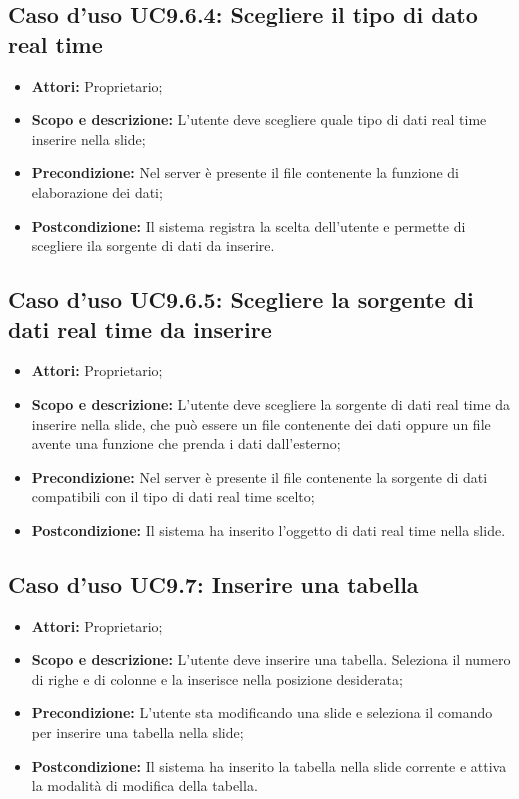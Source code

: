 	\subsection{Caso d'uso UC9.6.4: Scegliere il tipo di dato real time}
	\begin{itemize}
		\item \textbf{Attori:} Proprietario;
		\item \textbf{Scopo e descrizione:} L'utente deve scegliere quale tipo di dati real time inserire nella slide;
		\item \textbf{Precondizione:} Nel server è presente il file contenente la funzione di elaborazione dei dati;
		\item \textbf{Postcondizione:} Il sistema registra la scelta dell'utente e permette di scegliere ila sorgente di dati da inserire.
	\end{itemize}
	
	\subsection{Caso d'uso UC9.6.5: Scegliere la sorgente di dati real time da inserire}
	\begin{itemize}
		\item \textbf{Attori:} Proprietario;
		\item \textbf{Scopo e descrizione:} L'utente deve scegliere la sorgente di dati real time da inserire nella slide, che può essere un file contenente dei dati oppure un file avente una funzione che prenda i dati dall'esterno;
		\item \textbf{Precondizione:} Nel server è presente il file contenente la sorgente di dati compatibili con il tipo di dati real time scelto;
		\item \textbf{Postcondizione:} Il sistema ha inserito l'oggetto di dati real time nella slide.
	\end{itemize}
	

\subsection{Caso d'uso UC9.7: Inserire una tabella}
\begin{itemize}
	\item \textbf{Attori:} Proprietario;
	\item \textbf{Scopo e descrizione:} L'utente deve inserire una tabella. Seleziona il numero di righe e di colonne e la inserisce nella posizione desiderata;
	\item \textbf{Precondizione:} L'utente sta modificando una \gls{slide} e seleziona il comando per inserire una tabella nella \gls{slide};
	\item \textbf{Postcondizione:} Il sistema ha inserito la tabella nella \gls{slide} corrente e attiva la modalità di modifica della tabella.
\end{itemize}


